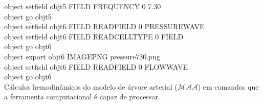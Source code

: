 \begin{appendices}
\begin{algorithm}[H]
		object set\underline{\space\space}field obj\underline{\space\space}t5 FIELD FREQUENCY 0 7.30 \\
		object go obj\underline{\space\space}t5 \\
		object set\underline{\space\space}field obj\underline{\space\space}t6 FIELD READ\underline{\space\space}FIELD 0 PRESSURE\underline{\space\space}WAVE \\
		object set\underline{\space\space}field obj\underline{\space\space}t6 FIELD READ\underline{\space\space}CELL\underline{\space\space}TYPE 0 FIELD \\
		object go obj\underline{\space\space}t6 \\
		object export obj\underline{\space\space}t6 IMAGE\underline{\space\space}PNG pressure\underline{\space\space}7\underline{\space\space}30.png \\
		object set\underline{\space\space}field obj\underline{\space\space}t6 FIELD READ\underline{\space\space}FIELD 0 FLOW\underline{\space\space}WAVE \\
		object go obj\underline{\space\space}t6 \\
		
		\caption{Cálculos hemodinâmicos do modelo de árvore arterial ($\mathcal{MAA}$) em comandos que a ferramenta computacional é capaz de processar.}
	\end{algorithm}
	

\end{appendices}
